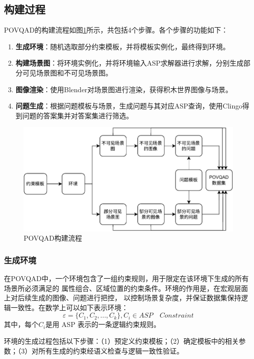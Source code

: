 \subsection{构建过程}
POVQAD的构建流程如图\ref{fig:dataset-generation}所示，共包括4个步骤。各个步骤的功能如下：
\begin{enumerate}[nosep]
\item \textbf{生成环境}：随机选取部分约束模板，并将模板实例化，最终得到环境。
\item \textbf{构建场景图}：将环境实例化，并将环境输入ASP求解器进行求解，分别生成部分可见场景图和不可见场景图。
\item \textbf{图像渲染}：使用Blender对场景图进行渲染，获得积木世界图像与场景。
\item \textbf{问题生成}：根据问题模板与场景，生成问题与其对应ASP查询，使用Clingo得到问题的答案集并对答案集进行筛选。
\end{enumerate}
\begin{figure}[h]
\centering
\includegraphics{figures/pipeline-POVQAD-crop.pdf}
\caption{POVQAD构建流程}
\label{fig:dataset-generation}
\end{figure}

\subsubsection{生成环境}
在POVQAD中，一个环境包含了一组约束规则，用于限定在该环境下生成的所有场景所必须满足的
属性组合、区域位置的约束条件。环境的作用是，在宏观层面上对后续生成的图像、问题进行把控，
以控制场景复杂度，并保证数据集保持逻辑一致性。在数学上可以如下表示环境：
$$ \varepsilon = \{C_1,C_2, ..., C_k \}, C_i \in ASP \quad Constraint $$
其中，每个$C_i$是用 ASP 表示的一条逻辑约束规则。

环境的生成过程包括以下步骤：（1）预定义约束模板；（2）确定模板中的相关参数；（3）对所有生成的约束经语义检查与逻辑一致性验证。

